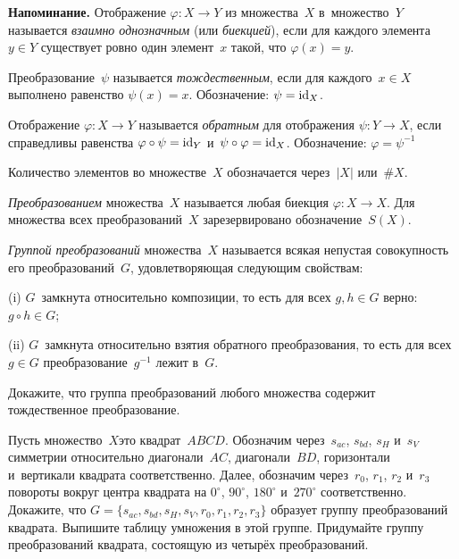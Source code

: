 \documentclass[a4paper,12pt]{article}
\newenvironment{напоминание}{\medskip\textbf{Напоминание.}}{\par}
\begin{document}
\vspace*{-1.5cm}
\begin{напоминание}
Отображение $\varphi\colon X\to Y$ из множества~$X$ в~множество~$Y$ называется \emph{взаимно однозначным} (или \emph{биекцией}), если для каждого элемента $y\in Y$ существует ровно один элемент~$x$ такой, что $\varphi(x)=y$.\par
Преобразование~$\psi$ называется \emph{тождественным}, если для каждого~$x\in X$ выполнено равенство $\psi(x)=x$. Обозначение: $\psi=\operatorname{id}_X$.\par
Отображение $\varphi\colon X\to Y$ называется \emph{обратным} для отображения $\psi\colon Y\to X$, если справедливы равенства $\varphi\circ\psi=\operatorname{id}_Y$ и~$\psi\circ\varphi=\operatorname{id}_X$. Обозначение: $\varphi=\psi^{-1}$\par
Количество элементов во множестве~$X$ обозначается через~$|X|$ или~$\#X$.
\end{напоминание}

\emph{Преобразованием} множества~$X$ называется любая биекция $\varphi\colon X\to X$. Для множества всех преобразований~$X$ зарезервировано обозначение~$S(X)$.

\emph{Группой преобразований} множества~$X$ называется всякая непустая совокупность его преобразований~$G$, удовлетворяющая следующим свойствам:
\begin{items}{-5}
\item[(i)]
$G$~замкнута относительно композиции, то есть для всех $g,h\in G$ верно: $g\circ h\in G$;
\item[(ii)]
$G$~замкнута относительно взятия обратного преобразования, то есть для всех $g\in G$  преобразование~$g^{-1}$ лежит в~$G$.
\end{items}

Докажите, что группа преобразований любого множества содержит тождественное преобразование.


\label{square}
Пусть множество~$X$\т это квадрат~$ABCD$. Обозначим через~$s_{ac}$, $s_{bd}$, $s_H$ и~$s_V$ симметрии относительно диагонали~$AC$, диагонали~$BD$, горизонтали и~вертикали квадрата соответственно. Далее, обозначим через~$r_0$, $r_1$, $r_2$ и~$r_3$ повороты вокруг центра квадрата на $0^\circ$, $90^\circ$, $180^\circ$ и~$270^\circ$ соответственно.
Докажите, что $G=\{s_{ac},s_{bd},s_H,s_V,r_0,r_1,r_2,r_3\}$ образует группу преобразований квадрата.
Выпишите таблицу умножения в этой группе.
Придумайте группу преобразований квадрата, состоящую из четырёх преобразований.
\end{document}

